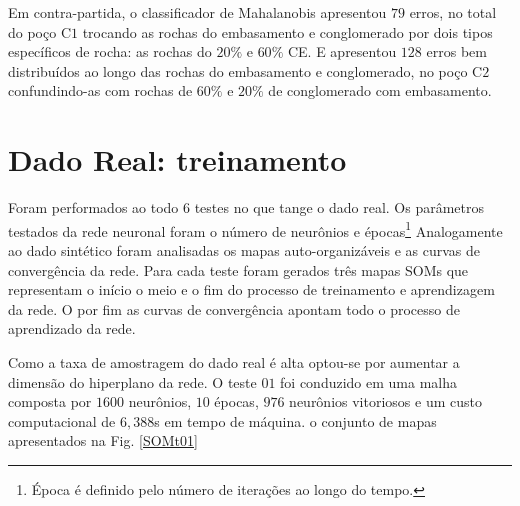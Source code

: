 Em contra-partida, o classificador de Mahalanobis apresentou $79$ erros, no total do poço C$1$ trocando as rochas do embasamento e conglomerado por dois tipos específicos de rocha: as rochas do $20\%$ e $60\%$ CE. E apresentou $128$ erros bem distribuídos ao longo das rochas do embasamento e conglomerado, no poço C$2$ confundindo-as com rochas de $60\%$ e $20\%$ de conglomerado com embasamento. 


\section{Dado Real: treinamento}

Foram performados ao todo $6$ testes no que tange o dado real. Os parâmetros testados da rede neuronal foram o número de neurônios e épocas\footnote{Época é definido pelo número de iterações ao longo do tempo.} Analogamente ao dado sintético foram analisadas os mapas auto-organizáveis e as curvas de convergência da rede. Para cada teste foram gerados três mapas SOMs que representam o início o meio e o fim do processo de treinamento e aprendizagem da rede. O por fim as curvas de convergência apontam todo o processo de aprendizado da rede. 

Como a taxa de amostragem do dado real é alta optou-se por aumentar a dimensão do hiperplano da rede. O teste $01$ foi conduzido em uma malha composta por $1600$ neurônios, $10$ épocas, $976$ neurônios vitoriosos e um custo computacional de $6,388$s em tempo de máquina. o conjunto de mapas apresentados na Fig. \ref{SOMt01}

